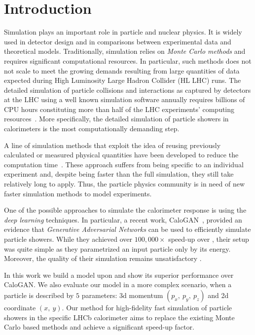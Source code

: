 \section{Introduction}

Simulation plays an important role in particle and nuclear physics. It is widely used in detector design and in comparisons between experimental data and theoretical models. Traditionally, simulation relies on \textit{Monte Carlo methods} and requires significant computational resources. In particular, such methods does not not scale to meet the growing demands resulting from large quantities of data expected during High Luminosity Large Hadron Collider (HL LHC) runs. The detailed simulation of particle collisions and interactions as captured by detectors at the LHC using a well known simulation software \geant annually requires billions of CPU hours constituting more than half of the LHC experiments' computing resources~\cite{bozzi2014,flynn2015computing}. More specifically, the detailed simulation of particle showers in calorimeters is the most computationally demanding step.
 
A line of simulation methods that exploit the idea of reusing previously calculated or measured physical quantities have been developed to reduce the computation time~\cite{grindhammer2000parameterized,atlas2010simulation}. These approach suffers from being specific to an individual experiment and, despite being faster than the full simulation, they still take relatively long to apply. Thus, the particle physics community is in need of new faster simulation methods to model experiments. 
    
One of the possible approaches to simulate the calorimeter response is using the \textit{deep learning} techniques. In particular, a recent work, CaloGAN~\cite{paganini2017calogan}, provided an evidence that \textit{Generative Adversarial Networks} can be used to efficiently simulate particle showers. While they achieved over $100,000 \times$ speed-up over \geant, their setup was quite simple as they parametrized an input particle only by its energy. Moreover, the quality of their simulation remains unsatisfactory . 

In this work we build a model upon  and show its superior performance over CaloGAN. We also evaluate our model in a more complex scenario, when a particle is described by $5$ parameters: 3d momentum $(p_x,~ p_y,~ p_z)$ and 2d coordinate $(x,~ y)$. Our method for high-fidelity fast simulation of particle showers in the specific LHCb calorimeter aims to replace the existing Monte Carlo based methods and achieve a significant speed-up factor.
 



